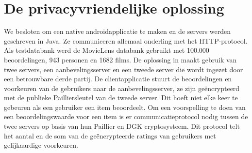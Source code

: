 \documentclass[twocolumn]{phdsymp} %
\begin{document}
\section{De privacyvriendelijke oplossing}
We besloten om een native androidapplicatie te maken en de servers werden geschreven in Java. Ze communiceren allemaal onderling met het HTTP-protocol. Als testdatabank werd de MovieLens databank gebruikt met 100.000 beoordelingen, 943 personen en 1682 films. De oplossing in \cite{dyn} maakt gebruik van twee servers, een aanbevelingsserver en een tweede server die wordt ingezet door een betrouwbare derde partij. De clientapplicatie stuurt de beoordelingen en voorkeuren van de gebruikers naar de aanbevelingsserver, ze zijn ge\"encrypteerd met de publieke Pailliersleutel van de tweede server. Dit hoeft niet elke keer te gebeuren als een gebruiker een item beoordeelt. Om een voorspelling te doen van een beoordelingswaarde voor een item is er communicatieprotocol nodig tussen de twee servers op basis van hun Paillier en DGK cryptosysteem. Dit protocol telt het aantal en de som van de ge\"encrypteerde ratings van gebruikers met gelijkaardige voorkeuren.
\end{document}
